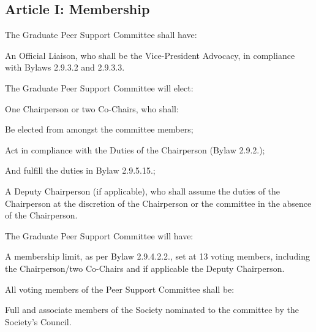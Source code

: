 \subsection{Article I: Membership}
\begin{longenum}[ label*=\thesubsection.\arabic*., align=left] 	
	\item The Graduate Peer Support Committee shall have:
		\begin{longenum}[label*=\arabic*., align=left]	
		\item An Official Liaison, who shall be the Vice-President Advocacy, in compliance with Bylaws 2.9.3.2 and 2.9.3.3.
		\end{longenum}
	\item The Graduate Peer Support Committee will elect:
		\begin{longenum}[label*=\arabic*., align=left]
		\item One Chairperson or two Co-Chairs, who shall:
			\begin{longenum}[label*=\arabic*., align=left]
			\item Be elected from amongst the committee members;
			\item Act in compliance with the Duties of the Chairperson (Bylaw 2.9.2.);
			\item And fulfill the duties in Bylaw 2.9.5.15.;
			\end{longenum}
		\item A Deputy Chairperson (if applicable), who shall assume the duties of the     Chairperson at the discretion of the Chairperson or the committee in the absence of the Chairperson.
		\end{longenum}
	\item The Graduate Peer Support Committee will have:
		\begin{longenum}[label*=\arabic*., align=left]
		\item A membership limit, as per Bylaw 2.9.4.2.2., set at 13 voting members, including the Chairperson/two Co-Chairs and if applicable the Deputy Chairperson.
		\end{longenum}
	\item All voting members of the Peer Support Committee shall be:
		\begin{longenum}[label*=\arabic*., align=left]
		\item Full and associate members of the Society nominated to the committee by the Society’s Council.   
		\end{longenum}
\end{longenum}

